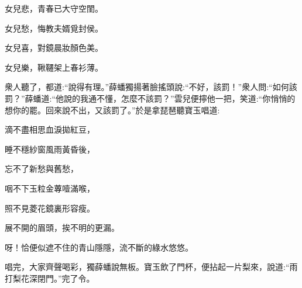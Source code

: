 \begin{poem}
    \begin{pl} 女兒悲，青春已大守空閨。\end{pl}

    \begin{pl} 女兒愁，悔教夫婿覓封侯。\end{pl}

    \begin{pl} 女兒喜，對鏡晨妝顏色美。\end{pl}

    \begin{pl} 女兒樂，鞦韆架上春衫薄。\end{pl}
\end{poem}


\begin{parag}
    衆人聽了，都道:“說得有理。”薛蟠獨揚著臉搖頭說:“不好，該罰！”衆人問:“如何該罰？”薛蟠道:“他說的我通不懂，怎麼不該罰？”雲兒便擰他一把，笑道:“你悄悄的想你的罷。回來說不出，又該罰了。”於是拿琵琶聽寶玉唱道:
\end{parag}


\begin{poem}
    \begin{pl}滴不盡相思血淚拋紅豆，\end{pl}

    \begin{pl}睡不穩紗窗風雨黃昏後，\end{pl}

    \begin{pl}忘不了新愁與舊愁，\end{pl}

    \begin{pl}咽不下玉粒金蓴噎滿喉，\end{pl}

    \begin{pl}照不見菱花鏡裏形容瘦。\end{pl}

    \begin{pl}展不開的眉頭，挨不明的更漏。\end{pl}

    \begin{pl}呀！恰便似遮不住的青山隱隱，流不斷的綠水悠悠。\end{pl}
\end{poem}


\begin{parag}
    唱完，大家齊聲喝彩，獨薛蟠說無板。寶玉飲了門杯，便拈起一片梨來，說道:“雨打梨花深閉門。”完了令。
\end{parag}



